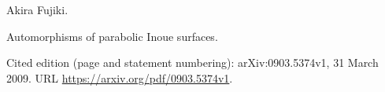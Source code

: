 Akira Fujiki.

\newblock Automorphisms of parabolic {Inoue} surfaces.

\newblock Cited edition (page and statement numbering): arXiv:0903.5374v1, 31 March 2009.
\newblock URL \url{https://arxiv.org/pdf/0903.5374v1}.

